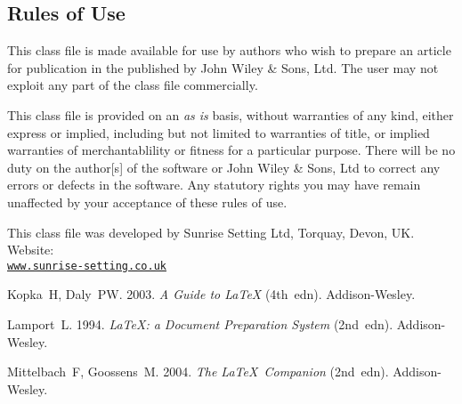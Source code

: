 \documentclass[times]{nmeauth}
\begin{document}
\subsection{Rules of Use}
This class file is made available for use by authors who wish to
prepare an article for publication in the \emph{\journalnamelc}
published by John Wiley \& Sons, Ltd. The user may not exploit any
part of the class file commercially.

This class file is provided on an \emph{as is}  basis, without
warranties of any kind, either express or implied, including but
not limited to warranties of title, or implied  warranties of
merchantablility or fitness for a particular purpose. There will
be no duty on the author[s] of the software or  John Wiley \&
Sons, Ltd to correct any errors or defects in the software. Any
statutory  rights you may have remain unaffected by your
acceptance of these rules of use.

\ack This class file was developed by Sunrise Setting Ltd,
Torquay, Devon, UK. Website:\\
\href{http://www.sunrise-setting.co.uk}{\texttt{www.sunrise-setting.co.uk}}

\begin{thebibliography}{9}

 Kopka~H, Daly~PW. 2003. \emph{A Guide to \LaTeX} (4th~edn).
Addison-Wesley.

 Lamport~L. 1994. \emph{\LaTeX: a Document Preparation System} (2nd~edn).
Addison-Wesley.

 Mittelbach~F, Goossens~M. 2004. \emph{The \LaTeX\ Companion}
(2nd~edn). Addison-Wesley.
\end{thebibliography}
\end{document}
